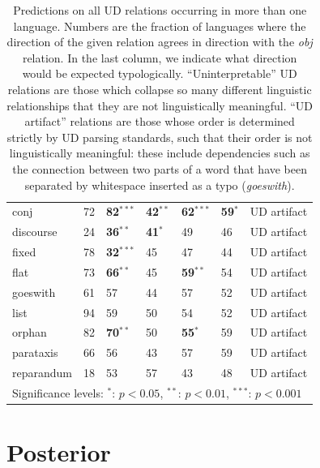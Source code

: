 \documentclass[12pt]{article}
\begin{document}
\begin{table}
\begin{center}
{\begin{tabular}{|l|l|l|ll|l|l|}
\hline
conj  &  72   &   \textbf{82}$^{***}$   &   \textbf{42}$^{**}$   &   \textbf{62}$^{***}$   &   \textbf{59}$^{*}$  & UD artifact  \\
discourse  &  24   &   \textbf{36}$^{**}$   &   \textbf{41}$^{*}$   &   49   &   46  & UD artifact   \\
fixed  &  78   &   \textbf{32}$^{***}$   &   45   &   47   &   44  & UD artifact   \\
flat  &  73   &   \textbf{66}$^{**}$   &   45   &   \textbf{59}$^{**}$   &   54  & UD artifact   \\
goeswith  &  61   &   57   &   44   &   57   &   52  & UD artifact   \\
list  &  94   &   59   &   50   &   54   &   52  & UD artifact  \\
orphan  &  82   &   \textbf{70}$^{**}$   &   50   &   \textbf{55}$^{*}$   &   59  & UD artifact   \\
parataxis  &  66   &   56   &   43   &   57   &   59  & UD artifact  \\
reparandum  &  18   &   53   &   57   &   43   &   48  & UD artifact  \\


 \hline
    \multicolumn{7}{l}{\footnotesize{Significance levels: $^*$: $p < 0.05$, $^{**}$: $p < 0.01$, $^{***}$: $p < 0.001$}}
\end{tabular}
}

\end{center}
\caption{Predictions on all UD relations occurring in more than one language. Numbers are the fraction of languages where the direction of the given relation agrees in direction with the \emph{obj} relation. In the last column, we indicate what direction would be expected typologically. ``Uninterpretable'' UD relations are those which collapse so many different linguistic relationships that they are not linguistically meaningful. ``UD artifact'' relations are those whose order is determined strictly by UD parsing standards, such that their order is not linguistically meaningful: these include dependencies such as the connection between two parts of a word that have been separated by whitespace inserted as a typo (\emph{goeswith}).}
\label{tab:all-predictions}
\end{table}


\section{Posterior}
\end{document}
